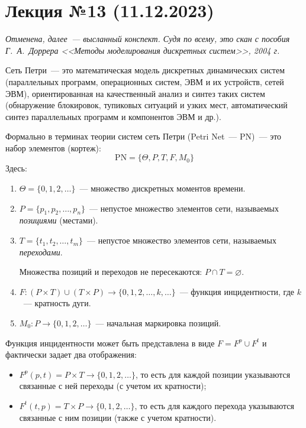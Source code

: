\section{Лекция №13 (11.12.2023)}

\textit{Отменена, далее~--- высланный конспект. Судя по всему, это скан с пособия Г.~А.~Доррера <<Методы моделирования дискретных систем>>, 2004 г.}

\begin{dd}
    Сеть Петри~--- это математическая модель дискретных динамических систем (параллельных программ, операционных систем, ЭВМ и их устройств, сетей ЭВМ), ориентированная на качественный анализ и синтез таких систем (обнаружение блокировок, тупиковых ситуаций и узких мест, автоматический синтез параллельных программ и компонентов ЭВМ и др.).
\end{dd}

Формально в терминах теории систем сеть Петри (Petri Net~--- PN)~--- это набор элементов (кортеж):
%
\begin{equation*}
    \text{PN} = \{ \Theta, P, T, F, M_0 \}
\end{equation*}
%
Здесь:

\begin{enumerate}
    \item ${\Theta = \{ 0, 1, 2, \dots \}}$~--- множество дискретных моментов времени.
    \item ${P = \{ p_1, p_2, \dots, p_n \}}$~--- непустое множество элементов сети, называемых \textit{позициями} (местами).
    \item ${T = \{ t_1, t_2, \dots, t_m \}}$~--- непустое множество элементов сети, называемых \textit{переходами}.
    
    Множества позиций и переходов не пересекаются: ${ P\cap T = \varnothing }$.

    \item ${F\colon (P\times T)\cup(T\times P)\rightarrow \{ 0, 1, 2, \dots, k, \dots \}}$~--- функция инцидентности, где $k$~--- кратность дуги.
    \item ${M_0\colon P\rightarrow \{ 0, 1, 2, \dots \}}$~--- начальная маркировка позиций.
\end{enumerate}

Функция инцидентности может быть представлена в виде ${F = F^p\cup F^t}$ и фактически задает два отображения:

\begin{itemize}
    \item ${F^p(p, t) = P\times T\rightarrow \{ 0, 1, 2, \dots \}}$, то есть для каждой позиции указываются связанные с ней переходы (с учетом их кратности);
    \item ${F^t(t, p) = T\times P\rightarrow \{ 0, 1, 2, \dots \}}$, то есть для каждого перехода указываются связанные с ним позиции (также с учетом кратности).
\end{itemize}

